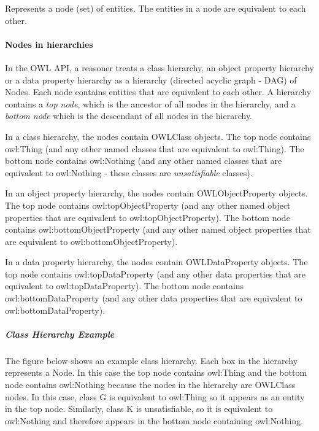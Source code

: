Represents a node (set) of entities. The entities in a node are equivalent to each other. 

\paragraph*{Nodes in hierarchies}

In the O\-W\-L A\-P\-I, a reasoner treats a class hierarchy, an object property hierarchy or a data property hierarchy as a hierarchy (directed acyclic graph -\/ D\-A\-G) of {\ttfamily Nodes}. Each node contains entities that are equivalent to each other. A hierarchy contains a {\itshape top node}, which is the ancestor of all nodes in the hierarchy, and a {\itshape bottom node} which is the descendant of all nodes in the hierarchy. 

In a class hierarchy, the nodes contain {\ttfamily O\-W\-L\-Class} objects. The top node contains {\ttfamily owl\-:Thing} (and any other named classes that are equivalent to {\ttfamily owl\-:Thing}). The bottom node contains {\ttfamily owl\-:Nothing} (and any other named classes that are equivalent to {\ttfamily owl\-:Nothing} -\/ these classes are {\itshape unsatisfiable} classes). 

In an object property hierarchy, the nodes contain {\ttfamily O\-W\-L\-Object\-Property} objects. The top node contains {\ttfamily owl\-:top\-Object\-Property} (and any other named object properties that are equivalent to {\ttfamily owl\-:top\-Object\-Property}). The bottom node contains {\ttfamily owl\-:bottom\-Object\-Property} (and any other named object properties that are equivalent to {\ttfamily owl\-:bottom\-Object\-Property}). 

In a data property hierarchy, the nodes contain {\ttfamily O\-W\-L\-Data\-Property} objects. The top node contains {\ttfamily owl\-:top\-Data\-Property} (and any other data properties that are equivalent to {\ttfamily owl\-:top\-Data\-Property}). The bottom node contains {\ttfamily owl\-:bottom\-Data\-Property} (and any other data properties that are equivalent to {\ttfamily owl\-:bottom\-Data\-Property}).

\subparagraph*{Class Hierarchy Example}

The figure below shows an example class hierarchy. Each box in the hierarchy represents a {\ttfamily Node}. In this case the top node contains {\ttfamily owl\-:Thing} and the bottom node contains {\ttfamily owl\-:Nothing} because the nodes in the hierarchy are {\ttfamily O\-W\-L\-Class} nodes. In this case, class {\ttfamily G} is equivalent to {\ttfamily owl\-:Thing} so it appears as an entity in the top node. Similarly, class {\ttfamily K} is unsatisfiable, so it is equivalent to {\ttfamily owl\-:Nothing} and therefore appears in the bottom node containing {\ttfamily owl\-:Nothing}. 

